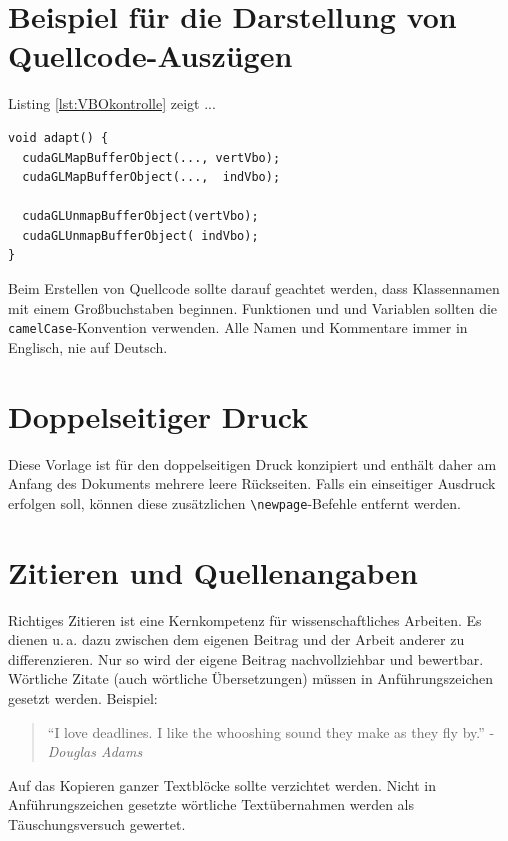 \section{Beispiel für die Darstellung von Quellcode-Auszügen}


Listing \ref{lst:VBOkontrolle} zeigt ...

\begin{lstlisting}[float = htpb,caption={Pseudocode für die Kontrolle der VBOs.}, label=lst:VBOkontrolle,captionpos=b,keywordstyle=\bfseries\color{black}] 
void adapt() {
  cudaGLMapBufferObject(..., vertVbo);
  cudaGLMapBufferObject(...,  indVbo);

  cudaGLUnmapBufferObject(vertVbo);
  cudaGLUnmapBufferObject( indVbo);
}
\end{lstlisting}

Beim Erstellen von Quellcode sollte darauf geachtet werden, dass Klassennamen mit einem Großbuchstaben beginnen. Funktionen und und Variablen sollten die {\tt camelCase}-Konvention verwenden. Alle Namen und Kommentare immer in Englisch, nie auf Deutsch.

\section{Doppelseitiger Druck}

Diese Vorlage ist für den doppelseitigen Druck konzipiert und enthält daher am Anfang des Dokuments mehrere leere Rückseiten. Falls ein einseitiger Ausdruck erfolgen soll, können diese zusätzlichen \texttt{\textbackslash newpage}-Befehle entfernt werden.

\section{Zitieren und Quellenangaben}

Richtiges Zitieren ist eine Kernkompetenz für wissenschaftliches Arbeiten. Es dienen \mbox{u.\,a.} dazu zwischen dem eigenen Beitrag und der Arbeit anderer zu differenzieren. Nur so wird der eigene Beitrag nachvollziehbar und bewertbar.\\

Wörtliche Zitate (auch wörtliche Übersetzungen) müssen in Anführungszeichen gesetzt werden. Beispiel:
\begin{quote}
	``I love deadlines. I like the whooshing sound they make as they fly by.''
	\noindent\hfill-\em Douglas Adams
\end{quote}

Auf das Kopieren ganzer Textblöcke sollte verzichtet werden. Nicht in Anführungszeichen gesetzte wörtliche Textübernahmen werden als Täuschungsversuch gewertet.\\


